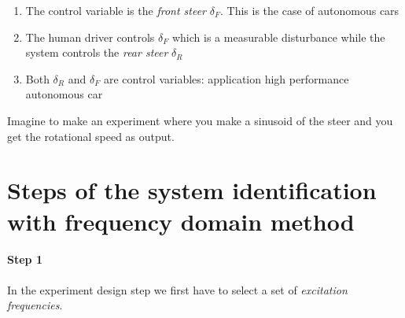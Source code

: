\begin{example}
\begin{figure}[H]
    \end{figure}

    \begin{enumerate}
        \item The control variable is the \emph{front steer} $\delta_F$. This is the case of autonomous cars
        \item The human driver controls $\delta_F$ which is a measurable disturbance while the system controls the \emph{rear steer} $\delta_R$ 
        \item Both $\delta_R$ and $\delta_F$ are control variables: application high performance autonomous car
    \end{enumerate}
    
    Imagine to make an experiment where you make a sinusoid of the steer and you get the rotational speed as output.
\end{example}

\section{Steps of the system identification with frequency domain method }

\paragraph{Step 1} In the experiment design step we first have to select a set of \emph{excitation frequencies}.

